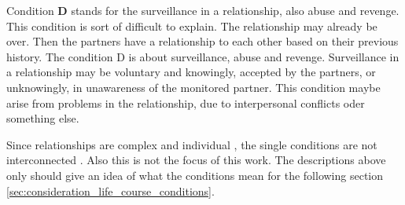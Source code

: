 Condition \textbf{D} stands for the surveillance in a relationship, also abuse and revenge. This condition is sort of difficult to explain. 
The relationship may already be over. Then the partners have a relationship to each other based on their previous history. The condition D is about surveillance, abuse and revenge. Surveillance in a relationship may be voluntary and knowingly, accepted by the partners, or unknowingly, in unawareness of the monitored partner.
This condition maybe arise from problems in the relationship, due to interpersonal conflicts oder something else.

Since relationships are complex and individual \cite{sassler2010partnering}, the single conditions are not interconnected . Also this is not the focus of this work. The descriptions above only should give an idea of what the conditions mean for the following section \ref{sec:consideration_life_course_conditions}.
